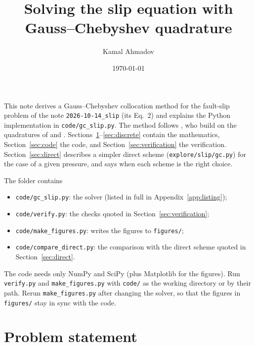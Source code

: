 \documentclass[12pt]{article}
\begin{document}
\title{Solving the slip equation with Gauss--Chebyshev quadrature}
\author{Kamal Ahmadov}
\date{\today}
\maketitle

This note derives a Gauss--Chebyshev collocation method for the fault-slip
problem of the note \texttt{2026-10-14\_slip} (its Eq.~2) and explains the
Python implementation in \texttt{code/gc\_slip.py}. The method follows
\textcite[Sec.~2 and 3.2]{ViescaGaragash2018}, who build on the quadratures of
\textcite{ErdoganGupta1972} and \textcite{ErdoganEtAl1973}.
Sections~\ref{sec:problem}--\ref{sec:discrete} contain the mathematics,
Section~\ref{sec:code} the code, and Section~\ref{sec:verification} the
verification. Section~\ref{sec:direct} describes a simpler direct scheme
(\texttt{explore/slip/gc.py}) for the case of a given pressure, and says when
each scheme is the right choice.

The folder contains
\begin{itemize}
	\item \texttt{code/gc\_slip.py}: the solver (listed in full in
	      Appendix~\ref{app:listing});
	\item \texttt{code/verify.py}: the checks quoted in
	      Section~\ref{sec:verification};
	\item \texttt{code/make\_figures.py}: writes the figures to
	      \texttt{figures/};
	\item \texttt{code/compare\_direct.py}: the comparison with the direct
	      scheme quoted in Section~\ref{sec:direct}.
\end{itemize}
The code needs only NumPy and SciPy (plus Matplotlib for the figures). Run
\texttt{verify.py} and \texttt{make\_figures.py} with
\texttt{code/} as the working directory or by their path. Rerun
\texttt{make\_figures.py} after changing the solver, so that the figures in
\texttt{figures/} stay in sync with the code.

\section{Problem statement}\label{sec:problem}
\end{document}
